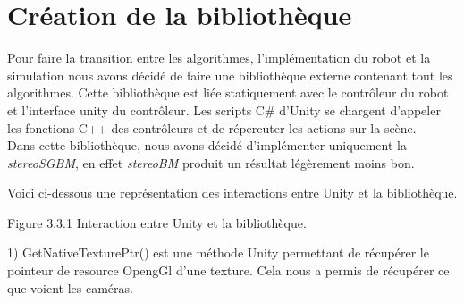 \documentclass[12pt,a4paper]{report}
\begin{document}
\section{Création de la bibliothèque}
Pour faire la transition entre les algorithmes, l'implémentation du robot et la simulation nous avons décidé de faire une bibliothèque externe contenant tout les algorithmes.
Cette bibliothèque est liée statiquement avec le contrôleur du robot et l'interface unity du contrôleur. Les scripts C\# d'Unity se chargent d'appeler les fonctions C++ des contrôleurs et de répercuter les actions sur la scène.\\
Dans cette bibliothèque, nous avons décidé d'implémenter uniquement la \textit{stereoSGBM}, en effet \textit{stereoBM} produit un résultat légèrement moins bon.

Voici ci-dessous une représentation des interactions entre Unity et la bibliothèque. %
\begin{center}

Figure 3.3.1 Interaction entre Unity et la bibliothèque.\\
\end{center}
\begin{small}
1) GetNativeTexturePtr() est une méthode Unity permettant de récupérer le pointeur de resource OpengGl d'une texture. Cela nous a permis de récupérer ce que voient les caméras.
\end{small}
\end{document}
